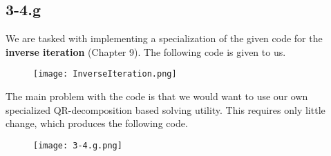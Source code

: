 \documentclass{article}
\begin{document}
\pagebreak

\subsection*{3-4.g}
We are tasked with implementing a specialization of the given code for the \textbf{inverse iteration} (Chapter 9). The following code is given to us.
\begin{figure}[!hbt]
    \centering
\texttt{[image: InverseIteration.png]}
\end{figure}

\noindent The main problem with the code is that we would want to use our own specialized QR-decomposition based solving utility. This requires only little change, which produces the following code.

\begin{figure}[!hbt]
    \centering
\texttt{[image: 3-4.g.png]}
\end{figure}
\end{document}
